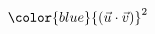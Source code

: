 \documentclass[preview]{standalone}
\begin{document}
\begin{align*}
&{\color{blue}{\left(\vec{u} \cdot \vec{v} \right)}^2} \\
\end{align*}
\end{document}
